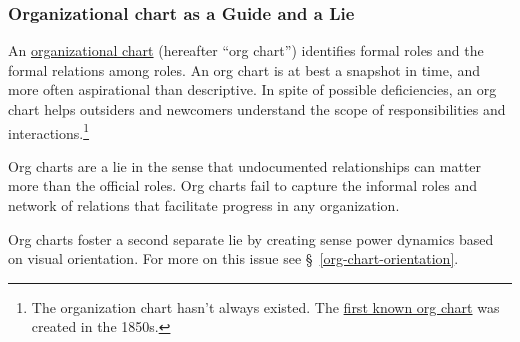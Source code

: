 \subsubsection*{Organizational chart as a Guide and a Lie}

An \href{https://en.wikipedia.org/wiki/Organizational_chart}{organizational chart} (hereafter ``org chart'') identifies formal roles and the formal relations among roles. An org chart is at best a snapshot in time, and more often aspirational than descriptive. In spite of possible deficiencies, an org chart helps outsiders and newcomers understand the scope of responsibilities and interactions.\footnote{The organization chart hasn't always existed. The \href{https://en.wikipedia.org/wiki/George_Holt_Henshaw\#First_organization_chart}{first known org chart} was created in the 1850s.}

Org charts are a lie in the sense that undocumented relationships can matter more than the official roles. Org charts fail to capture the informal roles and network of relations that facilitate progress in any organization. 

Org charts foster a second separate lie by creating sense power dynamics based on visual orientation. For more on this issue see \S~\ref{org-chart-orientation}.
